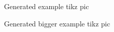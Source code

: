 \documentclass[12pt,a4paper,oneside]{article}
\begin{document}
\begin{figure}[ht!]
	\centering
	
	\caption{Generated example tikz pic}\label{fig:example_generated}
\end{figure}
\clearpage
\begin{figure}[ht!]
	\centering
	
	\caption{Generated bigger example tikz pic}\label{fig:example_generated_big}
\end{figure}
\end{document}
